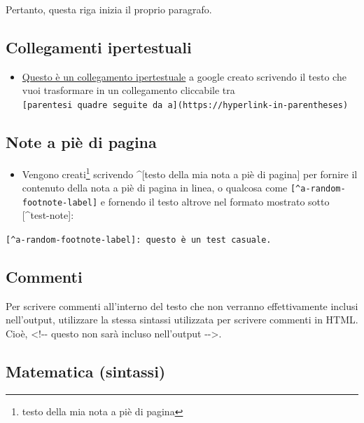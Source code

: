 \documentclass[a4paper, 11pt, nobind]{templates/ociamthesis}
\providecommand{\tightlist}{%
  \setlength{\itemsep}{0pt}\setlength{\parskip}{0pt}}
\begin{document}
Pertanto, questa riga inizia il proprio paragrafo.

\hypertarget{collegamenti-ipertestuali}{%
\subsection{Collegamenti ipertestuali}\label{collegamenti-ipertestuali}}

\begin{itemize}
\tightlist
\item
  \href{https://www.google.com}{Questo è un collegamento ipertestuale} a google creato scrivendo il testo che vuoi trasformare in un collegamento cliccabile tra \texttt{{[}parentesi\ quadre\ seguite\ da\ a{]}(https://hyperlink-in-parentheses)}
\end{itemize}

\hypertarget{note-a-piuxe8-di-pagina}{%
\subsection{Note a piè di pagina}\label{note-a-piuxe8-di-pagina}}

\begin{itemize}
\tightlist
\item
  Vengono creati\footnote{testo della mia nota a piè di pagina} scrivendo \^{}{[}testo della mia nota a piè di pagina{]} per fornire il contenuto della nota a piè di pagina in linea, o qualcosa come \texttt{{[}\^{}a-random-footnote-label{]}} e fornendo il testo altrove nel formato mostrato sotto {[}\^{}test-note{]}:
\end{itemize}

\texttt{{[}\^{}a-random-footnote-label{]}:\ questo\ è\ un\ test\ casuale.}

\hypertarget{commenti}{%
\subsection{Commenti}\label{commenti}}

Per scrivere commenti all'interno del testo che non verranno effettivamente inclusi nell'output, utilizzare la stessa sintassi utilizzata per scrivere commenti in HTML. Cioè, \textless!-\/- questo non sarà incluso nell'output -\/-\textgreater.

\hypertarget{matematica-sintassi}{%
\subsection{Matematica (sintassi)}\label{matematica-sintassi}}
\end{document}
